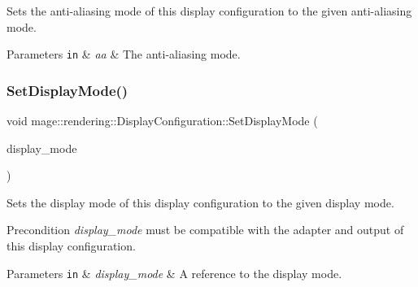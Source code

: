 Sets the anti-\/aliasing mode of this display configuration to the given anti-\/aliasing mode.


\begin{DoxyParams}[1]{Parameters}
\mbox{\tt in}  & {\em aa} & The anti-\/aliasing mode. \\
\hline
\end{DoxyParams}
\mbox{\label{classmage_1_1rendering_1_1_display_configuration_a7cc6b9dcf3932a62bfd1416fc7b397ea}} 
\subsubsection{\texorpdfstring{Set\+Display\+Mode()}{SetDisplayMode()}}
{\footnotesize\ttfamily void mage\+::rendering\+::\+Display\+Configuration\+::\+Set\+Display\+Mode (\begin{DoxyParamCaption}\item[{const D\+X\+G\+I\+\_\+\+M\+O\+D\+E\+\_\+\+D\+E\+SC \&}]{display\+\_\+mode }\end{DoxyParamCaption})\hspace{0.3cm}{\ttfamily [noexcept]}}

Sets the display mode of this display configuration to the given display mode.

\begin{DoxyPrecond}{Precondition}
{\itshape display\+\_\+mode} must be compatible with the adapter and output of this display configuration. 
\end{DoxyPrecond}

\begin{DoxyParams}[1]{Parameters}
\mbox{\tt in}  & {\em display\+\_\+mode} & A reference to the display mode. \\
\hline
\end{DoxyParams}
\mbox{\label{classmage_1_1rendering_1_1_display_configuration_a5e15cc1ca56718a7892b80cd0a1d20c0}} 
